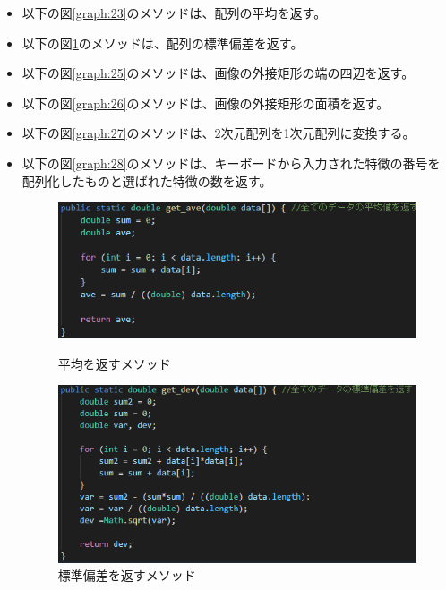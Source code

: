 \begin{itemize}
  \item 以下の図\ref{graph:23}のメソッドは、配列の平均を返す。
  \item 以下の図\ref{graph:24}のメソッドは、配列の標準偏差を返す。
  \item 以下の図\ref{graph:25}のメソッドは、画像の外接矩形の端の四辺を返す。
  \item 以下の図\ref{graph:26}のメソッドは、画像の外接矩形の面積を返す。
  \item 以下の図\ref{graph:27}のメソッドは、2次元配列を1次元配列に変換する。
  \item 以下の図\ref{graph:28}のメソッドは、キーボードから入力された特徴の番号を配列化したものと選ばれた特徴の数を返す。
  \begin{figure}[htbp]
    \begin{minipage}[t]{0.45\hsize}
      \includegraphics[scale=0.5]{平均.PNG}
      \centering
      \caption{平均を返すメソッド}
      \label{graph:23}
    \end{minipage}
    \begin{minipage}[t]{0.45\hsize}
      \includegraphics[scale=0.5]{その他2.PNG}
      \centering
      \caption{標準偏差を返すメソッド}
      \label{graph:24}
    \end{minipage}
    \begin{minipage}[t]{0.45\hsize}

\end{minipage}
\end{figure}
\end{itemize}
